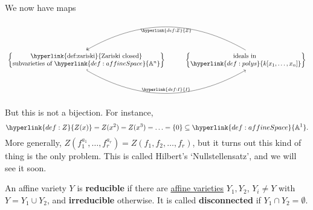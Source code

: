 \documentclass{article}
\newcommand{\A}{\mathbb{A}}
\begin{document}
We now have maps
\begin{equation*}
    \begin{tikzcd}
    \begin{Bmatrix}
        \text{\hyperlink{def:zariski}{Zariski closed}} \\
        \text{subvarieties of } \hyperlink{def:affineSpace}{\A^n}
    \end{Bmatrix}
    \ar[r, bend right, hookrightarrow, "\hyperlink{def:I}{I}", start anchor=south, end anchor=south]&
    \begin{Bmatrix}
        \text{ideals in } \\
        \hyperlink{def:polys}{k[x_1, \dotsc, x_n]}
    \end{Bmatrix}
    \ar[l, bend right, two heads, "\hyperlink{def:Z}{Z}", start anchor=north, end anchor=north]
\end{tikzcd}
\end{equation*}
But this is not a bijection. For instance,
\begin{equation*}\hyperlink{def:Z}{Z(x)} = Z(x^2) = Z(x^3) = \dotsc = \{0\} \subseteq \hyperlink{def:affineSpace}{\A^1}.\end{equation*}
More generally,
$Z( f_1^{a_1}, \dotsc, f_r^{a_r}) = Z(f_1, f_2, \dotsc, f_r)$,
but it turns out this kind of thing is the only problem.
This is called Hilbert's `Nullstellensatz', and we will see it soon.
\begin{defi}[Reducible]
    An affine variety $Y$ is \textbf{reducible} if there are \hyperlink{def:Z}{affine varieties} $Y_1, Y_2$, $Y_i \neq Y$ with $Y = Y_1 \cup Y_2$, and \textbf{irreducible} otherwise. It is called \textbf{disconnected} if $Y_1 \cap Y_2 = \emptyset$.
\end{defi}

\end{document}
